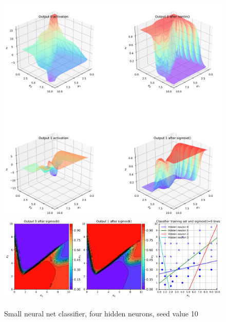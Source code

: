\FloatBarrier
 
\begin{figure}[p]
\centering
\includegraphics[width=\textwidth]{pic/chC-classifa04}
\includegraphics[width=\textwidth]{pic/chC-classifb04}
\caption{Small neural net classifier, four hidden neurons, seed value 10\label{fig:chC-classif04}}
\end{figure}

